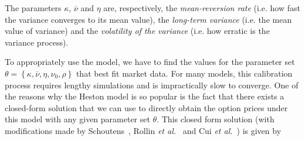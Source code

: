 The parameters $\kappa$, $\overline{\nu}$ and $\eta$ are, respectively, the \emph{mean-reversion rate} (i.e. how fast the variance converges to its mean value), the \emph{long-term variance} (i.e. the mean value of variance) and the \emph{volatility of the variance} (i.e. how erratic is the variance process).

To appropriately use the model, we have to find the values for the parameter set $\theta=\left\{\kappa,\overline{\nu},\eta,\nu_0,\rho\right\}$ that best fit market data. For many models, this calibration process requires lengthy simulations and is impractically slow to converge. One of the reasons why the Heston model is so popular is the fact that there exists a closed-form solution that we can use to directly obtain the option prices under this model with any given parameter set $\theta$. This closed form solution (with modifications made by Schoutens~\citep{Schoutens}, Rollin \textit{et al.}~\citep{Rollin} and Cui \textit{et al.}~\citep{Cui}) is given by


